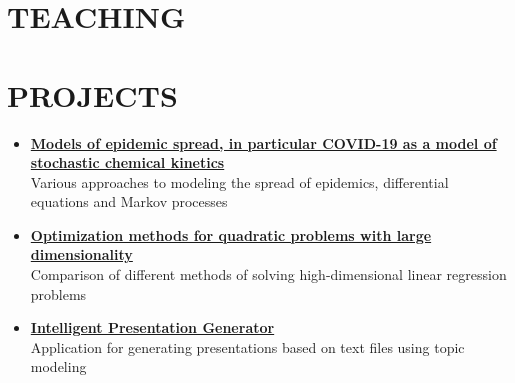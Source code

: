\documentclass[11pt,a4paper]{moderncv}
\begin{document}
\section{TEACHING}

\section{PROJECTS}
\begin{itemize}
    \item \href{https://github.com/kisnikser/Epidemic-Spread-Models}{\textbf{Models of epidemic spread, in particular COVID-19 as a model of stochastic chemical kinetics}}\\
    Various approaches to modeling the spread of epidemics, differential equations and Markov processes
    \item \href{https://github.com/kisnikser/Optimization-Methods}{\textbf{Optimization methods for quadratic problems with large dimensionality}}\\
    Comparison of different methods of solving high-dimensional linear regression problems
    \item \href{https://github.com/kisnikser/Intelligent-Presentation-Generator}{\textbf{Intelligent Presentation Generator}}\\
    Application for generating presentations based on text files using topic modeling
\end{itemize}
\end{document}
